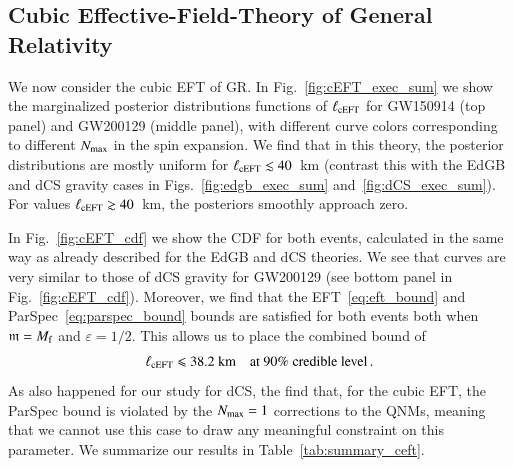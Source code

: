 \documentclass[twocolumn,
               prd,
               aps,
               superscriptaddress,
               tightenlines,
               nofootinbib,
               eqsecnum,
               amsfonts,
               amsmath,
               longbibliography]{revtex4-1}
\newcommand{\agcomm}[1]{{\textcolor{red}{{[AG: #1]}}}}
\begin{document}
%

\subsection{Cubic Effective-Field-Theory of General Relativity}
\label{sec:results_ceft}

We now consider the cubic EFT of GR.
%
In Fig.~\ref{fig:cEFT_exec_sum} we show the marginalized posterior distributions
functions of $\ell_{\rm cEFT}$ for GW150914 (top panel) and GW200129 (middle panel),
with different curve colors corresponding to different $N_{\rm max}$ in
the spin expansion.
%
We find that in this theory, the posterior distributions are mostly uniform for
$\ell_{\rm cEFT} \lesssim 40$~km (contrast this with the EdGB and dCS gravity
cases in Figs.~\ref{fig:edgb_exec_sum} and~\ref{fig:dCS_exec_sum}).
%
For values $\ell_{\rm cEFT} \gtrsim 40$~km, the posteriors smoothly approach zero.

In Fig.~\ref{fig:cEFT_cdf} we show the CDF for both events, calculated in the
same way as already described for the EdGB and dCS theories.
%
We see that curves are very similar to those of dCS gravity for GW200129 (see
bottom panel in Fig.~\ref{fig:cEFT_cdf}).
%
Moreover, we find that the EFT~\eqref{eq:eft_bound} and
ParSpec~\eqref{eq:parspec_bound} bounds are satisfied for both events both when
$\mathfrak{m} = M_{\rm f}$ and $\varepsilon = 1/2$.
%
This allows us to place the combined bound of
%
\begin{equation}
    \ell_{\rm cEFT} \leqslant 38.2~\textrm{km} \quad \textrm{at 90\% credible level}\,.
\end{equation}
%
As also happened for our study for dCS, the find that, for
the cubic EFT, the ParSpec bound is violated by the $N_{\rm max} = 1$ corrections to
the QNMs, meaning that we cannot use this case to draw any meaningful
constraint on this parameter.
%
We summarize our results in Table~\ref{tab:summary_ceft}.
\end{document}
